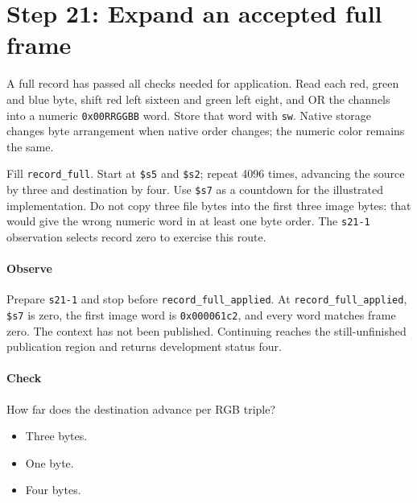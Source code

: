 \section{Step 21: Expand an accepted full frame}
A full record has passed all checks needed for application. Read each red,
green and blue byte, shift red left sixteen and green left eight, and OR the
channels into a numeric \texttt{0x00RRGGBB} word. Store that word with
\texttt{sw}. Native storage changes byte arrangement when native order changes;
the numeric color remains the same.

Fill \texttt{record\_full}. Start at \texttt{\$s5} and \texttt{\$s2}; repeat
4096 times, advancing the source by three and destination by four. Use
\texttt{\$s7} as a countdown for the illustrated implementation. Do not copy
three file bytes into the first three image bytes: that would give the wrong
numeric word in at least one byte order. The \texttt{s21-1} observation selects
record zero to exercise this route.

\paragraph{Observe} Prepare \texttt{s21-1} and stop before
\texttt{record\_full\_applied}. At \texttt{record\_full\_applied}, \texttt{\$s7} is zero,
the first image word is \texttt{0x000061c2}, and every word matches frame
zero. The context has not been published. Continuing reaches the still-unfinished
publication region and returns development status four.

\paragraph{Check} How far does the destination advance per RGB triple?
\begin{itemize}
\item[A.] Three bytes.
\item[B.] One byte.
\item[C.] Four bytes.
\end{itemize}
